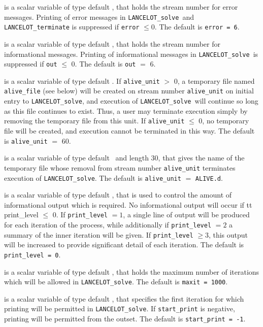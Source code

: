 \documentclass{galahad}
\newcommand{\fullpackagename}{LANC\-E\-LOT}
\newcommand{\solver}{{\tt \fullpackagename\_solve}}
\begin{document}
\begin{description}

 is a scalar variable of type default \integer, that holds the
stream number for error messages. Printing of error messages in
\solver\ and {\tt \fullpackagename\_terminate} is suppressed if
{\tt error} $\leq 0$.
The default is {\tt error = 6}.

 is a scalar variable of type default \integer, that holds the
stream number for informational messages.
Printing of informational messages in
\solver\
is suppressed if {\tt out} $\leq$ 0.
The default is {\tt out} $=$ 6.

 is a scalar variable of type default \integer.
If {\tt alive\_unit} $>$ 0, a temporary file named {\tt alive\_file} (see below)
will be created on stream number {\tt alive\_unit} on initial entry to
\solver, and execution of \solver\ will continue so
long as this file continues to exist. Thus, a user may terminate execution
simply by removing the temporary file from this unit.
If {\tt alive\_unit} $\leq$ 0, no temporary file will be created, and
execution cannot be terminated in this way.
The default is {\tt alive\_unit} $=$ 60.

 is a scalar variable of type default \character\ and length
30, that gives the name of the temporary file whose removal from stream number
{\tt alive\_unit} terminates execution of \solver.
The default is {\tt alive\_unit} $=$ {\tt ALIVE.d}.

 is a scalar variable of type default \integer, that is used
to control the amount of informational output which is required. No
informational output will occur if {tt print\_level} $\leq$ 0. If
{\tt print\_level} $= 1$, a single line of output will be produced for each
iteration of the process, while additionally if {\tt print\_level} $= 2$
a summary of the inner iteration will be given.
If {\tt print\_level} $\geq 3$, this output will be
increased to provide significant detail of each iteration.
The default is {\tt print\_level = 0}.

 is a scalar variable of type default \integer, that holds the
maximum number of iterations which will be allowed in \solver.
The default is {\tt maxit = 1000}.

 is a scalar variable of type default \integer, that specifies
the first iteration for which printing will be permitted in \solver.
If {\tt start\_print} is negative, printing will be permitted from the outset.
The default is {\tt start\_print = -1}.


\end{description}
\end{document}
